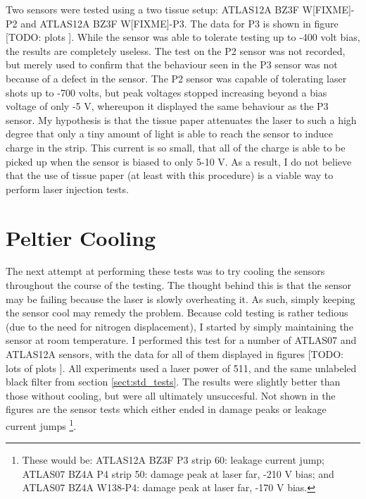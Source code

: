 \documentclass{report}
\begin{document}
            Two sensors were tested using a two tissue setup: ATLAS12A BZ3F W[FIXME]-P2 and ATLAS12A BZ3F W[FIXME]-P3. The data for P3 is shown in figure [TODO: plots
            ]. While the sensor was able to tolerate testing up to -400 volt bias, the results are completely useless. The test on the P2 sensor was not recorded, but merely used to confirm that the behaviour seen in the P3 sensor was not because of a defect in the sensor. The P2 sensor was capable of tolerating laser shots up to -700 volts, but peak voltages stopped increasing beyond a bias voltage of only -5 V, whereupon it displayed the same behaviour as the P3 sensor. My hypothesis is that the tissue paper attenuates the laser to such a high degree that only a tiny amount of light is able to reach the sensor to induce charge in the strip. This current is so small, that all of the charge is able to be picked up when the sensor is biased to only 5-10 V. As a result, I do not believe that the use of tissue paper (at least with this procedure) is a viable way to perform laser injection tests.
            
            

        \section{Peltier Cooling}
            The next attempt at performing these tests was to try cooling the sensors throughout the course of the testing. The thought behind this is that the sensor may be failing because the laser is slowly overheating it. As such, simply keeping the sensor cool may remedy the problem. Because cold testing is rather tedious (due to the need for nitrogen displacement), I started by simply maintaining the sensor at room temperature. I performed this test for a number of ATLAS07 and ATLAS12A sensors, with the data for all of them displayed in figures [TODO: lots of plots
            ]. All experiments used a laser power of 511, and the same unlabeled black filter from section \ref{sect:std_tests}. The results were slightly better than those without cooling, but were all ultimately unsuccesful. Not shown in the figures are the sensor tests which either ended in damage peaks or leakage current jumps \footnote{These would be: ATLAS12A BZ3F P3 strip 60: leakage current jump; ATLAS07 BZ4A P4 strip 50: damage peak at laser far, -210 V bias; and ATLAS07 BZ4A W138-P4: damage peak at laser far, -170 V bias.}.
\end{document}

